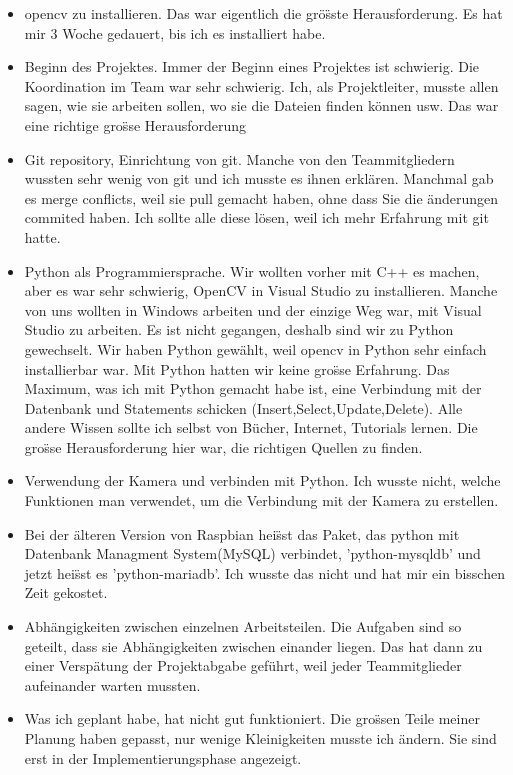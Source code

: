 \begin{itemize}
	\item opencv zu installieren. Das war eigentlich die gr\"o\"sste Herausforderung. Es hat mir 3 Woche gedauert, bis ich es installiert habe. 
	
	\item Beginn des Projektes. Immer der Beginn eines Projektes ist schwierig. Die Koordination im Team war sehr schwierig. Ich, als Projektleiter, musste allen sagen, wie sie arbeiten sollen, wo sie die Dateien finden k\"onnen usw. Das war eine richtige gro\"sse Herausforderung
	
	\item Git repository, Einrichtung von git. Manche von den Teammitgliedern wussten sehr wenig von git und ich musste es ihnen erkl\"aren. Manchmal gab es merge conflicts, weil sie pull gemacht haben, ohne dass Sie die \"anderungen commited haben. Ich sollte alle diese l\"osen, weil ich mehr Erfahrung mit git hatte. 
	
	\item Python als Programmiersprache. Wir wollten vorher mit C++ es machen, aber es war sehr schwierig, OpenCV in Visual Studio zu installieren. Manche von uns wollten in Windows arbeiten und der einzige Weg war, mit Visual Studio zu arbeiten. Es ist nicht gegangen, deshalb sind wir zu Python gewechselt. Wir haben Python gew\"ahlt, weil opencv in Python sehr einfach installierbar war. Mit Python hatten wir keine gro\"sse Erfahrung. Das Maximum, was ich mit Python gemacht habe ist, eine Verbindung mit der Datenbank und Statements schicken (Insert,Select,Update,Delete). Alle andere Wissen sollte ich selbst von B\"ucher, Internet, Tutorials lernen. Die gro\"sse Herausforderung hier war, die richtigen Quellen zu finden.
	
	\item Verwendung der Kamera und verbinden mit Python. Ich wusste nicht, welche Funktionen man verwendet, um die Verbindung mit der Kamera zu erstellen. 
	\item Bei der \"alteren Version von Raspbian hei\"sst das Paket, das python mit Datenbank Managment System(MySQL) verbindet, 'python-mysqldb' und jetzt hei\"sst es 'python-mariadb'. Ich wusste das nicht und hat mir ein bisschen Zeit gekostet.
	\item Abh\"angigkeiten zwischen einzelnen Arbeitsteilen. Die Aufgaben sind so geteilt, dass sie Abh\"angigkeiten zwischen einander liegen. Das hat dann zu einer Versp\"atung der Projektabgabe gef\"uhrt, weil jeder Teammitglieder aufeinander warten mussten. 
	\item Was ich geplant habe, hat nicht gut funktioniert. Die gro\"ssen Teile meiner Planung haben gepasst, nur wenige Kleinigkeiten musste ich \"andern. Sie sind erst in der Implementierungsphase angezeigt.
	\\
	\\
	

\end{itemize}
